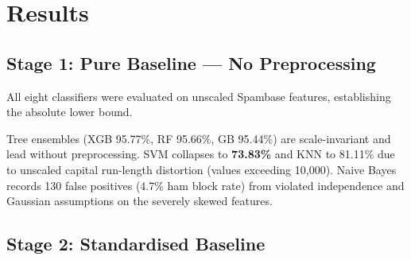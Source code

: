 \documentclass[conference]{IEEEtran}
\begin{document}
\section{Results}

\subsection{Stage 1: Pure Baseline --- No Preprocessing}

All eight classifiers were evaluated on unscaled Spambase
features, establishing the absolute lower bound.

\begin{table}[htbp]
\caption{Pure Baseline: Original Unscaled Features
(4,601 samples; 3,680/921 split)}
\label{tab:raw_baseline}
\centering
{}
\end{table}

Tree ensembles (XGB 95.77\%, RF 95.66\%, GB 95.44\%) are
scale-invariant and lead without preprocessing. SVM collapses
to \textbf{73.83\%} and KNN to 81.11\% due to unscaled capital
run-length distortion (values exceeding 10,000). Naive Bayes
records 130 false positives (4.7\% ham block rate) from violated
independence and Gaussian assumptions on the severely skewed
features.

\subsection{Stage 2: Standardised Baseline}
\end{document}
